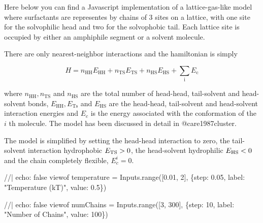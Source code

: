 \documentclass[
  letterpaper,
  enabledeprecatedfontcommands]{report}
\newenvironment{Shaded}{\begin{snugshade}}{\end{snugshade}}
\newcommand{\NormalTok}[1]{\textcolor[rgb]{0.00,0.23,0.31}{#1}}
\begin{document}
Here below you can find a Javascript implementation of a
lattice-gas-like model where surfactants are representes by chains of 3
sites on a lattice, with one site for the solvophilic head and two for
the solvophobic tail. Each lattice site is occupied by either an
amphiphile segment or a solvent molecule.

There are only nearest-neighbor interactions and the hamiltonian is
simply

\[
H=n_{\mathrm{HH}} E_{\mathrm{HH}}+n_{\mathrm{TS}} E_{\mathrm{TS}}+n_{\mathrm{HS}} E_{\mathrm{HS}}+\sum_{\mathrm{i}} E_{\mathrm{c}}
\]

where \(n_{\mathrm{HH}}, n_{\mathrm{TS}}\) and \(n_{\mathrm{HS}}\) are
the total number of head-head, tail-solvent and head-solvent bonds,
\(E_{\mathrm{HH}}, E_{\mathrm{Ts}}\) and \(E_{\mathrm{HS}}\) are the
head-head, tail-solvent and head-solvent interaction energies and
\(E_c\) is the energy associated with the conformation of the \(i\) th
molecule. The model has been discussed in detail in @care1987cluster.

The model is simplified by setting the head-head interaction to zero,
the tail-solvent interaction hydrophobic \(E_{\rm TS}>0\), the
head-solvent hydrophilic \(E_{\rm HS}<0\) and the chain completely
flexible, \(E_c^i=0\).

\begin{Shaded}
\begin{Highlighting}[]
\NormalTok{//| echo: false}
\NormalTok{viewof temperature = Inputs.range([0.01, 2], \{step: 0.05, label: "Temperature (kT)", value: 0.5\})}
\end{Highlighting}
\end{Shaded}

\begin{Shaded}
\begin{Highlighting}[]
\NormalTok{//| echo: false}
\NormalTok{viewof numChains = Inputs.range([3, 300], \{step: 10, label: "Number of Chains", value: 100\})}
\end{Highlighting}
\end{Shaded}
\end{document}
